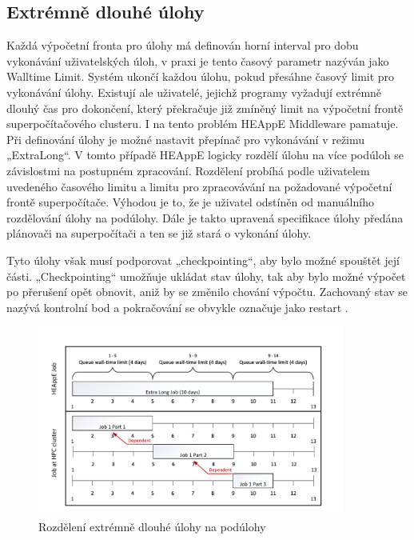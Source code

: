 \subsection{Extrémně dlouhé úlohy}
Každá výpočetní fronta pro úlohy má definován horní interval pro dobu vykonávání uživatelských úloh, v praxi je tento časový parametr nazýván jako Walltime Limit. Systém ukončí každou úlohu, pokud přesáhne časový limit pro vykonávání úlohy. Existují ale uživatelé, jejichž programy vyžadují extrémně dlouhý čas pro dokončení, který překračuje již zmíněný limit na výpočetní frontě superpočítačového clusteru. I na tento problém HEAppE Middleware pamatuje. Při definování úlohy je možné nastavit přepínač pro vykonávání v režimu „ExtraLong“. V tomto případě HEAppE logicky rozdělí úlohu na více podúloh se závislostmi na postupném zpracování. Rozdělení probíhá podle uživatelem uvedeného časového limitu a limitu pro zpracovávání na požadované výpočetní frontě superpočítače. Výhodou je to, že je uživatel odstíněn od manuálního rozdělování úlohy na podúlohy. Dále je takto upravená specifikace úlohy předána plánovači na superpočítači a ten se již stará o vykonání úlohy. 

Tyto úlohy však musí podporovat „checkpointing“, aby bylo možné spouštět její části. „Checkpointing“ umožňuje ukládat stav úlohy, tak aby bylo možné výpočet po přerušení opět obnovit, aniž by se změnilo chování výpočtu. Zachovaný stav se nazývá kontrolní bod a pokračování se obvykle označuje jako restart \cite{Padua2011}.

\hfill \break
\begin{figure}[h]
	\centering
	\includegraphics[width=0.9\textwidth]{Figures/ExtraLong.pdf}
	\caption{Rozdělení extrémně dlouhé úlohy na podúlohy}
	\label{fig:rozdeleni-extra-long}
\end{figure}